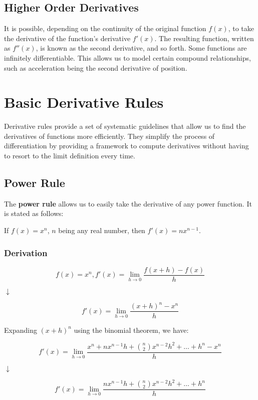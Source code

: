\documentclass[11pt]{article}
\begin{document}

\subsection{Higher Order Derivatives}
It is possible, depending on the continuity of the original function $f(x)$, to take the derivative of the function's derivative $f'(x)$. The resulting function, written as $f''(x)$, is known as the second derivative, and so forth. Some functions are infinitely differentiable. This allows us to model certain compound relationships, such as acceleration being the second derivative of position.


\section{Basic Derivative Rules}
Derivative rules provide a set of systematic guidelines that allow us to find the derivatives of functions more efficiently. They simplify the process of differentiation by providing a framework to compute derivatives without having to resort to the limit definition every time.

\subsection{Power Rule}
The \textbf{power rule} allows us to easily take the derivative of any power function. It is stated as follows: 

\begin{center}
If $f(x) = x^n$, $n$ being any real number, then $f'(x) = nx^{n-1}$.
\end{center}

\subsubsection{Derivation}

\[f(x) = x^n, f'(x) = \lim_{{h \to 0}} \frac{{f(x + h) - f(x)}}{{h}}\]
\begin{center}
$\downarrow$
\end{center}
\[f'(x) = \lim_{{h \to 0}} \frac{{(x + h)^n - x^n}}{{h}}\]

Expanding \((x + h)^n\) using the binomial theorem, we have:

\[f'(x) = \lim_{{h \to 0}} \frac{{x^n + nx^{n-1}h + \binom{n}{2}x^{n-2}h^2 + \ldots + h^n - x^n}}{{h}}\]
\begin{center}
$\downarrow$
\end{center}
\[f'(x) = \lim_{{h \to 0}} \frac{{nx^{n-1}h + \binom{n}{2}x^{n-2}h^2 + \ldots + h^n}}{{h}}\]
\end{document}
